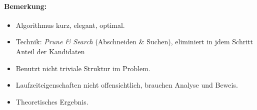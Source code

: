 \begin{description}
		\paragraph{Bemerkung:}
		\begin{itemize}
		 \item Algorithmus kurz, elegant, optimal.
		 \item Technik: \emph{Prune \& Search} (Abschneiden \& Suchen), eliminiert in jdem Schritt Anteil der Kandidaten
		 \item Benutzt nicht triviale Struktur im Problem.
		 \item Laufzeiteigenschaften nicht offensichtlich, brauchen Analyse und Beweis.
		 \item Theoretisches Ergebnis.
		\end{itemize}

\end{description}


